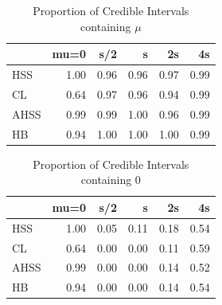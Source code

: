 \documentclass[AMA,STIX1COL]{WileyNJD-v2}\usepackage[]{graphicx}\usepackage[]{color}
\newenvironment{knitrout}{}{} %
\begin{document}
\begin{knitrout}
\color{fgcolor}\begin{table}

\caption{\label{tab:unnamed-chunk-20}Proportion of Credible Intervals containing $\mu$}
\centering
\begin{tabular}[t]{l|r|r|r|r|r}
\hline
  & mu=0 & s/2 & s & 2s & 4s\\
\hline
HSS & 1.00 & 0.96 & 0.96 & 0.97 & 0.99\\
\hline
CL & 0.64 & 0.97 & 0.96 & 0.94 & 0.99\\
\hline
AHSS & 0.99 & 0.99 & 1.00 & 0.96 & 0.99\\
\hline
HB & 0.94 & 1.00 & 1.00 & 1.00 & 0.99\\
\hline
\end{tabular}
\end{table}


\end{knitrout}

\begin{knitrout}
\color{fgcolor}\begin{table}

\caption{\label{tab:unnamed-chunk-21}Proportion of Credible Intervals containing 0}
\centering
\begin{tabular}[t]{l|r|r|r|r|r}
\hline
  & mu=0 & s/2 & s & 2s & 4s\\
\hline
HSS & 1.00 & 0.05 & 0.11 & 0.18 & 0.54\\
\hline
CL & 0.64 & 0.00 & 0.00 & 0.11 & 0.59\\
\hline
AHSS & 0.99 & 0.00 & 0.00 & 0.14 & 0.52\\
\hline
HB & 0.94 & 0.00 & 0.00 & 0.14 & 0.54\\
\hline
\end{tabular}
\end{table}


\end{knitrout}
\end{document}
